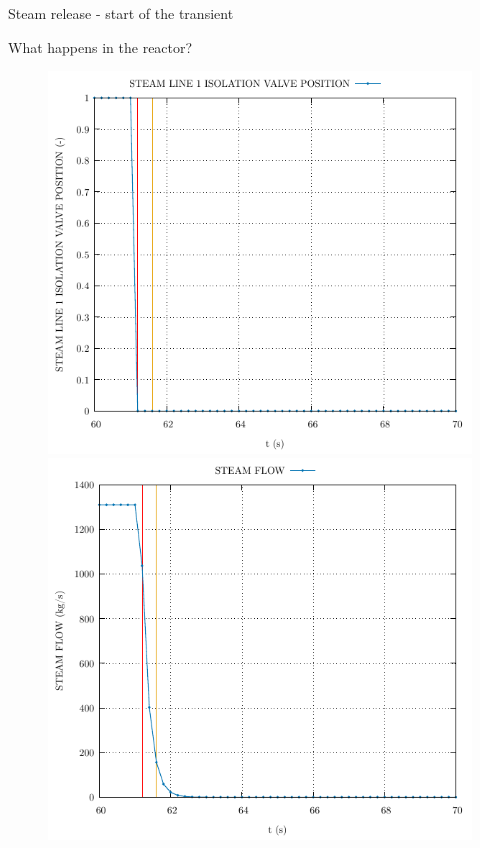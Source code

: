 \begin{frame}{Steam release - start of the transient}
\end{frame}

\begin{frame}{What happens in the reactor?}
	\begin{figure}
		\centering
		\begin{minipage}{.5\textwidth}
			\centering
			\includegraphics[width=0.7\linewidth]{./graphs/STEAM LINE 1 ISOLATION VALVE POSITION_start.pdf}
		\end{minipage}%
		\begin{minipage}{.5\textwidth}
			\centering
			\includegraphics[width=.7\linewidth]{./graphs/STEAM FLOW_start.pdf}

\end{minipage}
\end{figure}
\end{frame}
